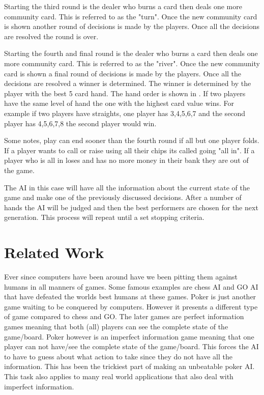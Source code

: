 Starting the third round is the dealer who burns a card then deals one more community card. This is referred to as the "turn". Once the new community card is shown another round of decisions is made by the players. Once all the decisions are resolved the round is over.

Starting the fourth and final round is the dealer who burns a card then deals one more community card. This is referred to as the "river". Once the new community card is shown a final round of decisions is made by the players. Once all the decisions are resolved a winner is determined. The winner is determined by the player with the best 5 card hand. The hand order is shown in . If two players have the same level of hand the one with the highest card value wins. For example if two players have straights, one player has 3,4,5,6,7 and the second player has 4,5,6,7,8 the second player would win.

Some notes, play can end sooner than the fourth round if all but one player folds. If a player wants to call or raise using all their chips its called going "all in". If a player who is all in loses and has no more money in their bank they are out of the game.

The AI in this case will have all the information about the current state of the game and make one of the previously discussed decisions. After a number of hands the AI will be judged and then the best performers are chosen for the next generation. This process will repeat until a set stopping criteria.


\section{Related Work}
Ever since computers have been around have we been pitting them against humans in all manners of games. Some famous examples are chess AI and GO AI that have defeated the worlds best humans at these games\cite{brown2017libratus}\cite{gilpin2005optimal}\cite{doi:10.1126/science.aay2400}. Poker is just another game waiting to be conquered by computers. However it presents a different type of game compared to chess and GO. The later games are perfect information games meaning that both (all) players can see the complete state of the game/board. Poker however is an imperfect information game meaning that one player can not have/see the complete state of the game/board\cite{brown2017libratus}\cite{davidson2000improved}\cite{gilpin2005optimal}\cite{gilpin2006competitive}\cite{doi:10.1126/science.aay2400}. This forces the AI to have to guess about what action to take since they do not have all the information. This has been the trickiest part of making an unbeatable poker AI. This task also applies to many real world applications that also deal with imperfect information.

